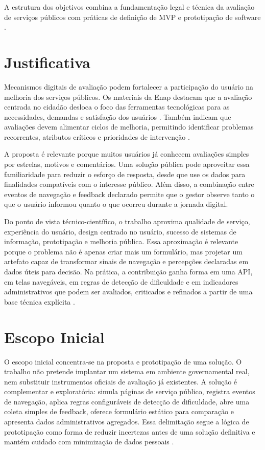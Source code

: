 A estrutura dos objetivos combina a fundamentação legal e técnica da avaliação de
serviços públicos com práticas de definição de MVP e prototipação de software
\cite{brasil2017lei13460,brasil2021lei14129,caroli2018leanInception,Sommerville2007}.

\section{Justificativa}

Mecanismos digitais de avaliação podem fortalecer a participação do usuário na
melhoria dos serviços públicos. Os materiais da Enap destacam que a avaliação
centrada no cidadão desloca o foco das ferramentas tecnológicas para as
necessidades, demandas e satisfação dos usuários \cite{limaPereira2020modulo1}.
Também indicam que avaliações devem alimentar ciclos de melhoria, permitindo
identificar problemas recorrentes, atributos críticos e prioridades de
intervenção \cite{limaPereira2020modulo4}.

A proposta é relevante porque muitos usuários já conhecem avaliações simples por
estrelas, motivos e comentários. Uma solução pública pode aproveitar essa
familiaridade para reduzir o esforço de resposta, desde que use os dados para
finalidades compatíveis com o interesse público. Além disso, a combinação entre
eventos de navegação e feedback declarado permite que o gestor observe tanto o
que o usuário informou quanto o que ocorreu durante a jornada digital.

Do ponto de vista técnico-científico, o trabalho aproxima qualidade de serviço,
experiência do usuário, design centrado no usuário, sucesso de sistemas de
informação, prototipação e melhoria pública. Essa aproximação é relevante porque
o problema não é apenas criar mais um formulário, mas projetar um artefato capaz
de transformar sinais de navegação e percepções declaradas em dados úteis para
decisão. Na prática, a contribuição ganha forma em uma API, em telas navegáveis,
em regras de detecção de dificuldade e em indicadores administrativos que podem
ser avaliados, criticados e refinados a partir de uma base técnica explícita
\cite{deloneMclean2003,hevner2004designscience,Sommerville2007}.

\section{Escopo Inicial}

O escopo inicial concentra-se na proposta e prototipação de uma solução. O
trabalho não pretende implantar um sistema em ambiente governamental real, nem
substituir instrumentos oficiais de avaliação já existentes. A solução é
complementar e exploratória: simula páginas de serviço público, registra eventos
de navegação, aplica regras configuráveis de detecção de dificuldade, abre uma
coleta simples de feedback, oferece formulário estático para comparação e
apresenta dados administrativos agregados. Essa delimitação segue a lógica de
prototipação como forma de reduzir incertezas antes de uma solução definitiva e
mantém cuidado com minimização de dados pessoais
\cite{Sommerville2007,brasil2018lgpd}.

